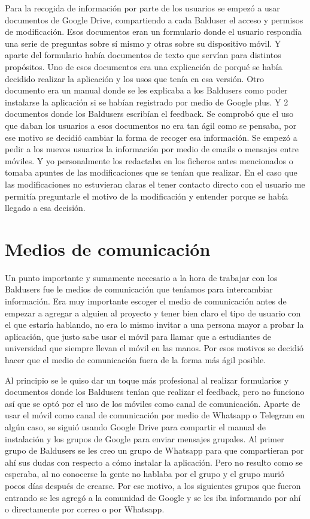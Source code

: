 Para la recogida de información por parte de los usuarios se empezó a usar documentos de Google Drive, compartiendo a cada Balduser el acceso y permisos de modificación.
Esos documentos eran un formulario donde el usuario respondía una serie de preguntas sobre sí mismo y otras sobre su dispositivo móvil. Y aparte del formulario había documentos de texto que servían para distintos propósitos.
Uno de esos documentos era una explicación de porqué se había decidido realizar la aplicación y los usos que tenía en esa versión.
Otro documento era un manual donde se les explicaba a los Baldusers como poder instalarse la aplicación si se habían registrado por medio de Google plus.
Y 2 documentos donde los Baldusers escribían el feedback.
Se comprobó que el uso que daban los usuarios a esos documentos no era tan ágil como se pensaba, por ese motivo se decidió cambiar la forma de recoger esa información.
Se empezó a pedir a los nuevos usuarios la información por medio de emails o mensajes entre móviles. Y yo personalmente los redactaba en los ficheros antes mencionados o tomaba apuntes de las modificaciones que se tenían que realizar.
En el caso que las modificaciones no estuvieran claras el tener contacto directo con el usuario me permitía preguntarle el motivo de la modificación y entender porque se había llegado a esa decisión.


\section{Medios de comunicación}
\label{secc:medios de comunicación}

Un punto importante y sumamente necesario a la hora de trabajar con los Baldusers fue le medios de comunicación que teníamos para intercambiar información.
Era muy importante escoger el medio de comunicación antes de empezar a agregar a alguien al proyecto y tener bien claro el tipo de usuario con el que estaría hablando, no era lo mismo invitar a una persona mayor a probar la aplicación, que justo sabe usar el móvil para llamar que a estudiantes de universidad que siempre llevan el móvil en las manos.
Por esos motivos se decidió hacer que el medio de comunicación fuera de la forma más ágil posible.

Al principio se le quiso dar un toque más profesional al realizar formularios y documentos donde los Baldusers tenían que realizar el feedback, pero no funciono así que se optó por el uso de los móviles como canal de comunicación.
Aparte de usar el móvil como canal de comunicación por medio de Whatsapp o Telegram en algún caso, se siguió usando Google Drive para compartir el manual de instalación y los grupos de Google para enviar mensajes grupales.
Al primer grupo de Baldusers se les creo un grupo de Whatsapp para que compartieran por ahí sus dudas con respecto a cómo instalar la aplicación. Pero no resulto como se esperaba, al no conocerse la gente no hablaba por el grupo y el grupo murió pocos días después de crearse.
Por ese motivo, a los siguientes grupos que fueron entrando se les agregó a la comunidad de Google y se les iba informando por ahí o directamente por correo o por Whatsapp.

